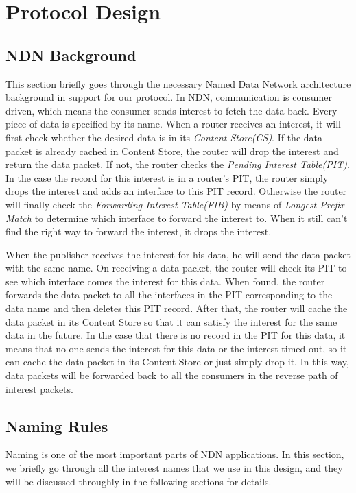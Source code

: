 \documentclass[conference]{IEEEtran}
\begin{document}
\section{Protocol Design}
\label{design}
\subsection{NDN Background}
This section briefly goes through the necessary Named Data Network architecture background in support for our protocol.
In NDN, communication is consumer driven,
which means the consumer sends interest to fetch the data back.
Every piece of data is specified by its name. When a router receives an interest,
it will first check whether the desired data is in its \emph{Content Store(CS)}.
If the data packet is already cached in Content Store,
the router will drop the interest and return the data packet.
If not, the router checks the \emph{Pending Interest Table(PIT)}.
In the case the record for this interest is in a router's PIT,
the router simply drops the interest and adds an interface to this PIT record.
Otherwise the router will finally check the \emph{Forwarding Interest Table(FIB)}
by means of \emph{Longest Prefix Match} to determine which interface to forward the interest to.
When it still can't find the right way to forward the interest, it drops the interest.

When the publisher receives the interest for his data,
he will send the data packet with the same name. On receiving a data packet,
the router will check its PIT to see which interface comes the interest for this data.
When found, the router forwards the data packet to all the interfaces in the PIT
corresponding to the data name and then deletes this PIT record.
After that, the router will cache the data packet in its Content Store
so that it can satisfy the interest for the same data in the future.
In the case that there is no record in the PIT for this data,
it means that no one sends the interest for this data or the interest timed out,
so it can cache the data packet in its Content Store or just simply drop it.
In this way, data packets will be forwarded back to all the consumers in the reverse path of interest packets.

\subsection{Naming Rules}

Naming is one of the most important parts of NDN applications.
In this section, we briefly go through all the interest names that we use in this design,
and they will be discussed throughly in the following sections for details.
\end{document}
